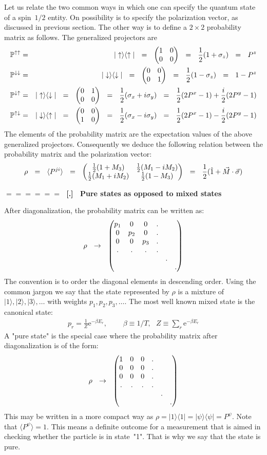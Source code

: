 \documentclass[onecolumn,fleqn]{revtex4}
\newcommand{\eexp}{\mathrm{e}^}
\newcommand{\amatrix}[1]{\begin{matrix} #1 \end{matrix}}
\newcommand{\beq}{\begin{eqnarray}}
\newcommand{\eeq}{\end{eqnarray}}
\renewcommand{\thesubsection}{\arabic{subsection}}
\renewcommand{\thesubsubsection}{\arabic{subsubsection}}
\newcommand{\sheadC}[1]
{
\addtocounter{subsubsection}{1}
\vspace{5mm}
{\Large\bf $=\!=\!=\!=\!=\!=\;$ [\thesubsection.\thesubsubsection] \ #1}  
\nopagebreak
\phantomsection
}
\begin{document}
Let us relate the two common ways in which one can specify 
the quantum state of a spin~$1/2$ entity.
On possibility is to specify the polarization vector, 
as discussed in previous section. 
The other way is to define a $2\times2$ 
probability matrix as follows. 
The generalized projectors are 
\beq
\mathbb{P}^{ \uparrow \uparrow} 
&=& |\uparrow \rangle\langle \uparrow| 
\ \ = \ \ \left(\amatrix{1&0\cr 0&0}\right)
\ \ = \ \ \frac{1}{2}(1 + \sigma_z) 
\ \ = \ \ P^{z}
\\ \nonumber
\mathbb{P}^{ \downarrow \downarrow } 
&=&  |\downarrow \rangle\langle \downarrow| 
\ \ = \ \ \left(\amatrix{0&0\cr 0&1}\right) 
\ \ = \ \ \frac{1}{2}(1 - \sigma_z) 
\ \ = \ \ 1-P^{z}
\\ \nonumber
\mathbb{P}^{\downarrow \uparrow} 
&=& |\uparrow \rangle\langle \downarrow| 
\ \ = \ \ \left(\amatrix{0&1\cr 0&0}\right)
\ \ = \ \ \frac{1}{2}(\sigma_x + i \sigma_y) 
\ \ = \ \ \frac{1}{2}(2P^x-1)+\frac{i}{2}(2P^y-1)
\\ \nonumber
\mathbb{P}^{ \uparrow \downarrow} 
&=& |\downarrow \rangle\langle \uparrow| 
\ \ = \ \ \left(\amatrix{0&0\cr 1&0}\right)
\ \ = \ \ \frac{1}{2}(\sigma_x -i \sigma_y) 
\ \ = \ \ \frac{1}{2}(2P^x-1)-\frac{i}{2}(2P^y-1)
\eeq
The elements of the probability matrix 
are the expectation values of the above 
generalized projectors. 
Consequently we deduce the following relation 
between the probability matrix 
and the polarization vector:
\beq
\rho 
\ \ = \ \ 
\langle P^{ji} \rangle 
\ \ = \ \ 
\left( \amatrix{ \frac{1}{2}(1+M_3)& \frac{1}{2}(M_1-iM_2)\cr \frac{1}{2}(M_1+iM_2)& \frac{1}{2}(1-M_3)} \right) 
\ \ = \ \ 
\frac{1}{2}(\hat{1}+\vec{M} \cdot \vec{\sigma}) 
\eeq

 
\sheadC{Pure states as opposed to mixed states}

After diagonalization, the probability matrix can be written as:
\beq
\rho \ \ \rightarrow \ \ \left(\amatrix{p_1&0&0&.\cr 0&p_2&0&.\cr 0&0&p_3&.\cr .&.&.&.\cr &&&&.\cr &&&&&.}\right) 
\eeq
The convention is to order the diagonal elements in descending order.
Using the common jargon we say that the state represented 
by $\rho$ is a mixture of ${|1 \rangle , |2 \rangle , |3 \rangle, \dots }$
with weights ${p_1, p_2, p_3, \dots }$.
The most well known mixed state is the canonical state:
\beq
p_r = \frac{1}{Z} \eexp{- \beta E_r}, 
\ \ \ \ \ \ \ \ \ \ \beta\equiv1/T, 
\ \ \ Z\equiv \sum_r \eexp{- \beta E_r}
\eeq
A "pure state" is the special case where the probability matrix 
after diagonalization is of the form:
\beq
\rho \ \ \rightarrow \ \ \left(\amatrix{1&0&0&.\cr 0&0&0&.\cr 0&0&0&.\cr .&.&.&.\cr &&&&.\cr &&&&&.} \right) 
\eeq
This may be written in a more compact 
way as ${\rho = |1 \rangle \langle 1| =| \psi \rangle \langle \psi| = P^{\psi} }$. 
Note that $\langle P^{\psi} \rangle = 1$. This means a definite  
outcome for a measurement that is aimed in checking whether 
the particle is in state~"1". That is why we say that the state is pure. 
\end{document}

